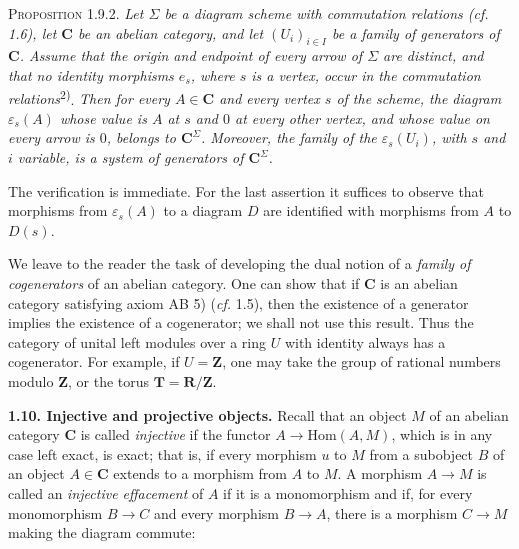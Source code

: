 
\textsc{Proposition 1.9.2.} \textit{Let $\Sigma$ be a diagram
scheme with commutation relations \textup{(}\textit{cf.} \textup{1.6)}, let $\mathbf{C}$ be an abelian category,
and let $(U_i)_{i\in I}$ be a family of generators of $\mathbf{C}$. Assume that the
origin and endpoint of every arrow of $\Sigma$ are distinct, and that no
identity morphisms $e_s$, where $s$ is a vertex, occur in the commutation
relations}\textsuperscript{2)}. \textit{Then for every $A\in \mathbf{C}$ and every
vertex $s$ of the scheme, the diagram $\varepsilon_s(A)$ whose value is $A$ at
$s$ and $0$ at every other vertex, and whose value on every arrow is $0$,
belongs to $\mathbf{C}^\Sigma$. Moreover, the family of the $\varepsilon_s(U_i)$, with
$s$ and $i$ variable, is a system of generators of $\mathbf{C}^\Sigma$.}

The verification is immediate. For the last assertion it suffices to observe
that morphisms from $\varepsilon_s(A)$ to a diagram $D$ are identified with
morphisms from $A$ to $D(s)$.

We leave to the reader the task of developing the dual notion of a
\textit{family of cogenerators} of an abelian category. One can show that if
$\mathbf{C}$ is an abelian category satisfying axiom AB 5) (\textit{cf.} 1.5), then the
existence of a generator implies the existence of a cogenerator; we shall not
use this result. Thus the category of unital left modules over a ring $U$ with
identity always has a cogenerator. For example, if $U=\mathbf Z$, one may take
the group of rational numbers modulo $\mathbf Z$, or the torus
$\mathbf T=\mathbf R/\mathbf Z$.

\textbf{1.10. Injective and projective objects.}
Recall that an object $M$ of an abelian category $\mathbf{C}$ is called
\textit{injective} if the functor $A\to\mathrm{Hom}(A,M)$, which is in
any case left exact, is exact; that is, if every morphism $u$ to $M$ from a
subobject $B$ of an object $A\in \mathbf{C}$ extends to a morphism from $A$ to $M$.
A morphism $A\to M$ is called an \textit{injective effacement} of
$A$ if it is a monomorphism and if, for every monomorphism
$B\to C$ and every morphism $B\to A$, there is a
morphism $C\to M$ making the diagram commute:

